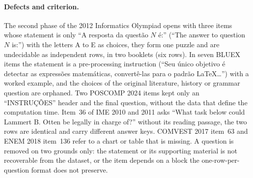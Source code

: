\paragraph{Defects and criterion.} The second phase of the 2012 Informatics
Olympiad opens with three items whose statement is only ``A resposta da
questão $N$ é:'' (``The answer to question $N$ is:'') with the letters A to E
as choices, they form one puzzle and are undecidable as independent rows, in
two booklets (six rows). In seven BLUEX items the statement is a
pre-processing instruction (``Seu único objetivo é detectar as expressões
matemáticas, convertê-las para o padrão LaTeX\ldots'') with a worked example,
and the choices of the original literature, history or grammar question are
orphaned. Two POSCOMP 2024 items kept only an ``INSTRUÇÕES'' header and the
final question, without the data that define the computation time. Item~36 of
IME 2010 and 2011 asks ``What task below could Lammert B. Otten be legally in
charge of?'' without its reading passage, the two rows are identical and carry
different answer keys. COMVEST 2017 item~63 and ENEM 2018 item~136 refer to a
chart or table that is missing. A question is removed on two grounds only:
the statement or its supporting material is not recoverable from the dataset,
or the item depends on a block the one-row-per-question format does not
preserve.

\begin{table}[t]
\centering
\scriptsize
\setlength{\tabcolsep}{3pt}
\caption{The removed questions, with item numbers in parentheses. \emph{S04}, \emph{S06}: rows removed from the filtered (41,653) and the semantically deduplicated (37,887) corpora; five listed questions were already absent from the latter because the exact deduplication had removed them as copies of another listed question. \emph{Detection}: abstention of the full annotation run with taxonomy 1.2 or 1.4, or the pattern sweep.}
\label{tab:rev-short-removed}
\end{table}

